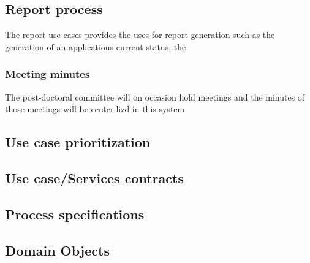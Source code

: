 \documentclass[12pt]{article}
\begin{document}
		\subsection{Report process}
		The report use cases provides the uses for report generation such as the generation of an applications current status, the 
		\subsubsection{Meeting minutes} %
		The post-doctoral committee will on occasion hold meetings and the minutes of those meetings will be centerilizd in this system.
		\vspace{0.2in}
		
		\subsection{Use case prioritization} %
		\vspace{0.2in}
		
		\vspace{0.2in}
		
		\subsection{Use case/Services contracts} %
		\vspace{0.2in}
		
		\vspace{0.2in}
		
		\subsection{Process specifications} %
		\vspace{0.2in}
		
		\vspace{0.2in}
		
		\subsection{Domain Objects} %
		\vspace{0.2in}
\end{document}
